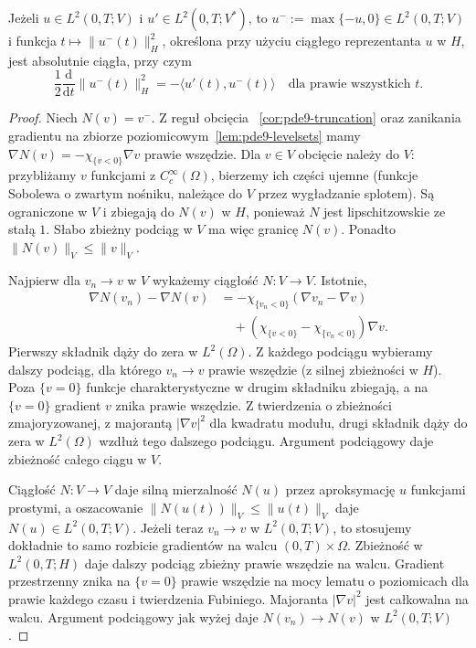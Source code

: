 \begin{lemat}\label{lem:pde20-trunc}
Jeżeli $u\in L^2(0,T;V)$ i $u'\in L^2(0,T;V^*)$, to
$u^-:=\max\{-u,0\}\in L^2(0,T;V)$ i funkcja
$t\mapsto\|u^-(t)\|_H^2$, określona przy użyciu
ciągłego reprezentanta $u$ w $H$, jest absolutnie ciągła, przy czym
\[
 \frac12\frac{\mathrm d}{\mathrm dt}\|u^-(t)\|_H^2
 =-\langle u'(t),u^-(t)\rangle
 \quad\text{dla prawie wszystkich }t.
\]
\end{lemat}
\begin{proof}
Niech $N(v)=v^-$. Z reguł obcięcia
~\ref{cor:pde9-truncation} oraz zanikania gradientu
na zbiorze poziomicowym~\ref{lem:pde9-levelsets}
mamy $\nabla N(v)=-\chi_{\{v<0\}}\nabla v$
prawie wszędzie. Dla $v\in V$ obcięcie należy do $V$:
przybliżamy $v$ funkcjami z $C_c^\infty(\Omega)$,
bierzemy ich części ujemne (funkcje Sobolewa o zwartym
nośniku, należące do $V$ przez wygładzanie splotem).
Są ograniczone w $V$ i zbiegają do $N(v)$ w $H$,
ponieważ $N$ jest lipschitzowskie ze stałą $1$.
Słabo zbieżny podciąg w $V$ ma więc granicę $N(v)$.
Ponadto $\|N(v)\|_V\le\|v\|_V$.

Najpierw dla $v_n\to v$ w $V$ wykażemy ciągłość
$N:V\to V$. Istotnie,
\[
 \begin{split}
 \nabla N(v_n)-\nabla N(v)
 &=-\chi_{\{v_n<0\}}(\nabla v_n-\nabla v)\\
 &\quad+(\chi_{\{v<0\}}-\chi_{\{v_n<0\}})\nabla v.
 \end{split}
\]
Pierwszy składnik dąży do zera w $L^2(\Omega)$.
Z każdego podciągu wybieramy dalszy podciąg,
dla którego $v_n\to v$ prawie wszędzie (z silnej
zbieżności w $H$). Poza $\{v=0\}$ funkcje
charakterystyczne w drugim składniku zbiegają,
a na $\{v=0\}$ gradient $v$ znika prawie wszędzie.
Z twierdzenia o zbieżności zmajoryzowanej, z majorantą
$|\nabla v|^2$ dla kwadratu modułu, drugi składnik
dąży do zera w $L^2(\Omega)$ wzdłuż tego dalszego
podciągu. Argument podciągowy daje zbieżność całego
ciągu w $V$.

Ciągłość $N:V\to V$ daje silną mierzalność $N(u)$
przez aproksymację $u$ funkcjami prostymi, a oszacowanie
$\|N(u(t))\|_V\le\|u(t)\|_V$ daje
$N(u)\in L^2(0,T;V)$. Jeżeli teraz
$v_n\to v$ w $L^2(0,T;V)$, to stosujemy dokładnie
to samo rozbicie gradientów na walcu
$(0,T)\times\Omega$. Zbieżność w $L^2(0,T;H)$
daje dalszy podciąg zbieżny prawie wszędzie na walcu.
Gradient przestrzenny znika na $\{v=0\}$ prawie
wszędzie na mocy lematu o poziomicach dla prawie
każdego czasu i twierdzenia Fubiniego.
Majoranta $|\nabla v|^2$ jest całkowalna na walcu.
Argument podciągowy jak wyżej daje
$N(v_n)\to N(v)$ w $L^2(0,T;V)$.


\end{proof}
